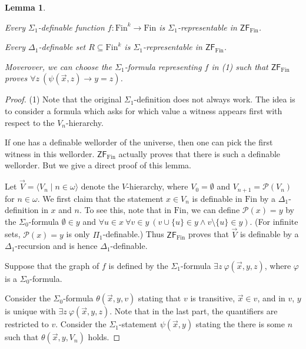 \documentclass[a4paper, 11pt]{amsart}
\newtheorem{lemma}[lemma]{Lemma}
\theoremstyle{remark}
\newcommand{\axiomft}[1]{\mathsf{#1}}
\newcommand{\ZF}{\axiomft{ZF}}
\newcommand{\Fin}{\mathrm{Fin}}
\newcommand{\pow}{\mathcal{P}}
\newenvironment{enumerate-(1)}{\begin{enumerate}[label={\upshape (\arabic*)}, leftmargin=2pc]}{\end{enumerate}}
\begin{document}
\begin{lemma} \ 
\label{represent Sigma1 functions and Delta1 sets} 
\begin{enumerate-(1)} 
\item 
Every $\Sigma_1$-definable function $f\colon \Fin^k\rightarrow \Fin$ is $\Sigma_1$-representable in $\ZF_\Fin$. 
\item 
Every $\Delta_1$-definable set $R\subseteq \Fin^k$ is $\Sigma_1$-representable in $\ZF_\Fin$. 
\end{enumerate-(1)} 
Moverover, we can choose the $\Sigma_1$-formula representing $f$ in (1) such that $\ZF_\Fin$ proves $\forall z\ ( \psi(\vec{x},z) \rightarrow y=z)$. 
\end{lemma} 
\begin{proof} 
(1) 
Note that the original $\Sigma_1$-definition does not always work. 
The idea is to consider a formula which asks for which value a witness appears first with respect to the $V_n$-hierarchy. 

If one has a definable wellorder of the universe, then one can pick the first witness in this wellorder. 
$\ZF_\Fin$ actually proves  that there is such a definable wellorder. 
But we give a direct proof of this lemma. 


Let $\vec{V}=\langle V_n \mid n\in\omega\rangle$ denote the $V$-hierarchy, where $V_0=\emptyset$ and $V_{n+1}=\pow(V_n)$ for $n\in\omega$. 
We first claim that the statement $x\in V_n$ is definable in $\Fin$ by a $\Delta_1$-definition in $x$ and $n$. 
To see this, note that in $\Fin$, we can define $\pow(x)=y$ by the $\Sigma_0$-formula $\emptyset\in y$ and $\forall u\in x\ \forall v\in y\ (v\cup \{u\} \in y \wedge v\setminus \{u\} \in y)$. (For infinite sets, $\pow(x)=y$ is only $\Pi_1$-definable.) 
Thus $\ZF_\Fin$ proves that $\vec{V}$ is definable by a $\Delta_1$-recursion and is hence $\Delta_1$-definable. 

Suppose that the graph of $f$ is defined by the $\Sigma_1$-formula 
$\exists z\ \varphi(\vec{x},y,z)$, where $\varphi$ is a $\Sigma_0$-formula. 

Consider the $\Sigma_0$-formula $\theta(\vec{x},y,v)$ stating that $v$ is transitive, $\vec{x}\in v$, and in $v$, $y$ is unique with $\exists z\ \varphi(\vec{x},y,z)$. 
Note that in the last part, the quantifiers are restricted to $v$. 
Consider the $\Sigma_1$-statement $\psi(\vec{x},y)$ stating the there is some $n$ such that $\theta(\vec{x},y,V_n)$ holds. 


\end{proof}
\end{document}
